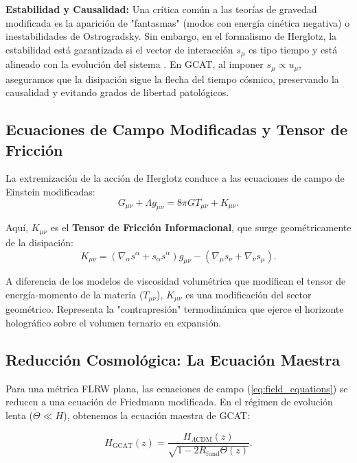 \documentclass[12pt, a4paper]{article}
\theoremstyle{plain}
\theoremstyle{definition}
\begin{document}
\textbf{Estabilidad y Causalidad:} Una crítica común a las teorías de gravedad modificada es la aparición de "fantasmas" (modos con energía cinética negativa) o inestabilidades de Ostrogradsky. Sin embargo, en el formalismo de Herglotz, la estabilidad está garantizada si el vector de interacción $s_\mu$ es tipo tiempo y está alineado con la evolución del sistema \cite{Lazo2017}. En GCAT, al imponer $s_\mu \propto u_\mu$, aseguramos que la disipación sigue la flecha del tiempo cósmico, preservando la causalidad y evitando grados de libertad patológicos.

\subsection{Ecuaciones de Campo Modificadas y Tensor de Fricción}

La extremización de la acción de Herglotz conduce a las ecuaciones de campo de Einstein modificadas:
\begin{equation}
G_{\mu\nu} + \Lambda g_{\mu\nu} = 8\pi G T_{\mu\nu} + K_{\mu\nu}.
\label{eq:field_equations}
\end{equation}

Aquí, $K_{\mu\nu}$ es el \textbf{Tensor de Fricción Informacional}, que surge geométricamente de la disipación:
\begin{equation}
K_{\mu\nu} = \left(\nabla_\alpha s^\alpha + s_\alpha s^\alpha \right) g_{\mu\nu} - \left(\nabla_\mu s_\nu + \nabla_\nu s_\mu \right).
\end{equation}

A diferencia de los modelos de viscosidad volumétrica que modifican el tensor de energía-momento de la materia ($T_{\mu\nu}$), $K_{\mu\nu}$ es una modificación del sector geométrico. Representa la "contrapresión" termodinámica que ejerce el horizonte holográfico sobre el volumen ternario en expansión.

\subsection{Reducción Cosmológica: La Ecuación Maestra}

Para una métrica FLRW plana, las ecuaciones de campo (\ref{eq:field_equations}) se reducen a una ecuación de Friedmann modificada. En el régimen de evolución lenta ($\dot{\Theta} \ll H$), obtenemos la ecuación maestra de GCAT:

\begin{equation}
H_{\text{GCAT}}(z) = \frac{H_{\Lambda\text{CDM}}(z)}{\sqrt{1 - 2 R_{\text{fund}} \Theta(z)}}.
\label{eq:master_equation}
\end{equation}
\end{document}
